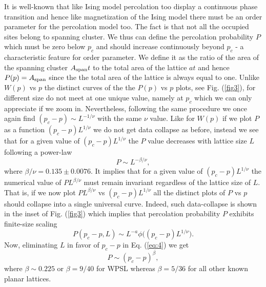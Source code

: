\documentclass[twocolumn,showpacs,preprintnumbers,amsmath,amssymb]{article}
\begin{document}
It is well-known that like Ising model percolation too display a continuous phase
transition and hence like magnetization of the Ising model there must be an order parameter for the percolation
model too. The fact is that not all the occupied sites 
belong to spanning cluster. We thus can define the percolation probability $P$ which must be zero 
below $p_c$ and should increase continuously beyond $p_c$ - a characteristic feature for order parameter.  
We define it as the ratio of the area of the spanning cluster
$A_{{\rm span}}t$ to the total area of the lattice $at$ and hence
$P(p)= A_{{\rm span}}$
since the the total area of the lattice is always equal to one. 
Unlike $W(p)$ vs $p$ the distinct curves of the the $P(p)$ vs $p$ plots, see Fig. (\ref{fig3}), for different size do not meet at one unique value,
namely at $p_c$ which we can only appreciate if we zoom in. Nevertheless,
following the same procedure we once again
find  $(p_c-p)\sim L^{-1/\nu}$ with the same $\nu$ value. Like for $W(p)$ if we plot $P$ as a function $(p_c-p)L^{1/\nu}$
we do not get data collapse as before, instead we see that for a given value of $(p_c-p)L^{1/\nu}$ the $P$ value 
decreases with lattice size $L$ following a power-law 
\begin{equation}
\label{eq:4}
P\sim L^{-\beta/\nu},
\end{equation}
where $\beta/\nu=0.135\pm 0.0076$. It implies that for a given value of $(p_c-p)L^{1/\nu}$ the numerical value of $PL^{\beta/\nu}$ must remain invariant regardless of the lattice size of $L$. That is, 
if we now plot $PL^{\beta/\nu}$ vs $(p_c-p)L^{1/\nu}$ all the distinct plots of $P$ vs $p$ should collapse into a single universal
curve. Indeed, such data-collapse is shown in the inset of Fig. (\ref{fig3}) which implies that percolation probability $P$
exhibits finite-size scaling
\begin{equation}
P(p_c-p,L)\sim L^{-a}\phi\Big ((p_c-p)L^{1/\nu}\Big ).
\end{equation}
Now, eliminating $L$ in favor of $p_c-p$ in Eq. (\ref{eq:4}) we get
\begin{equation}
\label{eq:5}
P\sim (p_c-p)^\beta,
\end{equation}
where $\beta\sim 0.225$ or $\beta=9/40$ for WPSL whereas $\beta=5/36$ for all other known planar lattices. 



\end{document}
